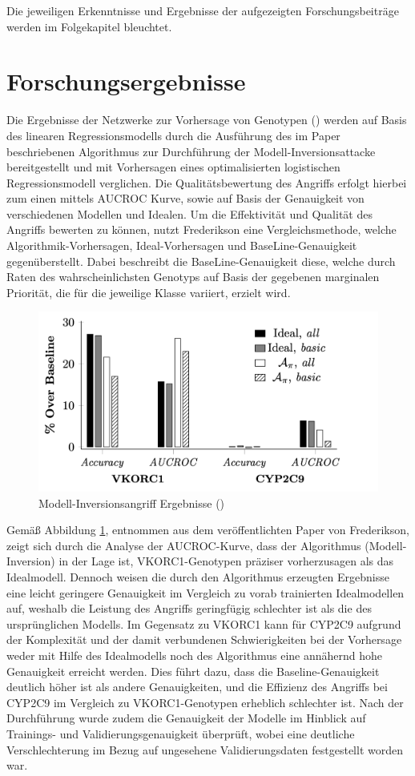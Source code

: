 Die jeweiligen Erkenntnisse und Ergebnisse der aufgezeigten Forschungsbeiträge werden im Folgekapitel bleuchtet.
\section{Forschungsergebnisse}
Die Ergebnisse der Netzwerke zur Vorhersage von Genotypen (\cite[S. 7 ff.]{fredrikson_privacy_2014}) werden auf Basis des linearen Regressionsmodells durch die Ausführung des im Paper beschriebenen Algorithmus zur Durchführung der Modell-Inversionsattacke bereitgestellt und mit Vorhersagen eines optimalisierten logistischen Regressionsmodell verglichen. Die Qualitätsbewertung des Angriffs erfolgt hierbei zum einen mittels \glqq AUCROC\grqq{} Kurve, sowie auf Basis der Genauigkeit von verschiedenen Modellen und Idealen. Um die Effektivität und Qualität des Angriffs bewerten zu können, nutzt Frederikson eine Vergleichsmethode, welche Algorithmik-Vorhersagen, Ideal-Vorhersagen und BaseLine-Genauigkeit gegenüberstellt. Dabei beschreibt die BaseLine-Genauigkeit diese, welche durch Raten des wahrscheinlichsten Genotyps auf Basis der gegebenen marginalen Priorität, die für die jeweilige Klasse variiert, erzielt wird.
\begin{figure}[H]
	\centering
	\includegraphics[width=0.6\linewidth]{Bilder/paper_fred_2014_graph.png}
	\caption{Modell-Inversionsangriff Ergebnisse (\cite[S. 7, Figure 3]{fredrikson_privacy_2014})}
	\label{img:frederikson_evaluation}
\end{figure}
Gemäß Abbildung \ref{img:frederikson_evaluation}, entnommen aus dem veröffentlichten Paper von Frederikson, zeigt sich durch die Analyse der AUCROC-Kurve, dass der Algorithmus (Modell-Inversion) in der Lage ist, VKORC1-Genotypen präziser vorherzusagen als das Idealmodell. Dennoch weisen die durch den Algorithmus erzeugten Ergebnisse eine leicht geringere Genauigkeit im Vergleich zu vorab trainierten Idealmodellen auf, weshalb die Leistung des Angriffs geringfügig schlechter ist als die des ursprünglichen Modells.
Im Gegensatz zu VKORC1 kann für CYP2C9 aufgrund der Komplexität und der damit verbundenen Schwierigkeiten bei der Vorhersage weder mit Hilfe des Idealmodells noch des Algorithmus eine annähernd hohe Genauigkeit erreicht werden. Dies führt dazu, dass die Baseline-Genauigkeit deutlich höher ist als andere Genauigkeiten, und die Effizienz des Angriffs bei CYP2C9 im Vergleich zu VKORC1-Genotypen erheblich schlechter ist.
Nach der Durchführung wurde zudem die Genauigkeit der Modelle im Hinblick auf Trainings- und Validierungsgenauigkeit überprüft, wobei eine deutliche Verschlechterung im Bezug auf ungesehene Validierungsdaten festgestellt worden war.

